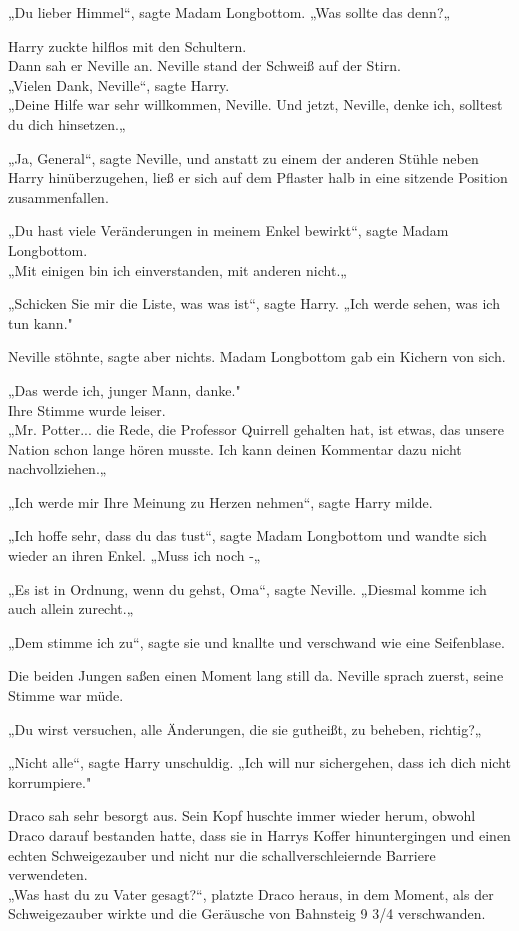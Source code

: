 {„Du lieber Himmel“, sagte Madam Longbottom. „Was sollte das denn?„

Harry zuckte hilflos mit den Schultern.\\ Dann sah er Neville an. Neville stand der Schweiß auf der Stirn.\\ „Vielen Dank, Neville“, sagte Harry.\\ „Deine Hilfe war sehr willkommen, Neville. Und jetzt, Neville, denke ich, solltest du dich hinsetzen.„

„Ja, General“, sagte Neville, und anstatt zu einem der anderen Stühle neben Harry hinüberzugehen, ließ er sich auf dem Pflaster halb in eine sitzende Position zusammenfallen.

„Du hast viele Veränderungen in meinem Enkel bewirkt“, sagte Madam Longbottom.\\ „Mit einigen bin ich einverstanden, mit anderen nicht.„

„Schicken Sie mir die Liste, was was ist“, sagte Harry. „Ich werde sehen, was ich tun kann."

Neville stöhnte, sagte aber nichts. Madam Longbottom gab ein Kichern von sich.

„Das werde ich, junger Mann, danke."\\ Ihre Stimme wurde leiser.\\ „Mr. Potter... die Rede, die Professor Quirrell gehalten hat, ist etwas, das unsere Nation schon lange hören musste. Ich kann deinen Kommentar dazu nicht nachvollziehen.„

„Ich werde mir Ihre Meinung zu Herzen nehmen“, sagte Harry milde.

„Ich hoffe sehr, dass du das tust“, sagte Madam Longbottom und wandte sich wieder an ihren Enkel. „Muss ich noch -„

„Es ist in Ordnung, wenn du gehst, Oma“, sagte Neville. „Diesmal komme ich auch allein zurecht.„

„Dem stimme ich zu“, sagte sie und knallte und verschwand wie eine Seifenblase.

Die beiden Jungen saßen einen Moment lang still da. Neville sprach zuerst, seine Stimme war müde.

„Du wirst versuchen, alle Änderungen, die sie gutheißt, zu beheben, richtig?„

„Nicht alle“, sagte Harry unschuldig. „Ich will nur sichergehen, dass ich dich nicht korrumpiere."

Draco sah sehr besorgt aus. Sein Kopf huschte immer wieder herum, obwohl Draco darauf bestanden hatte, dass sie in Harrys Koffer hinuntergingen und einen echten Schweigezauber und nicht nur die schallverschleiernde Barriere verwendeten.\\ „Was hast du zu Vater gesagt?“, platzte Draco heraus, in dem Moment, als der Schweigezauber wirkte und die Geräusche von Bahnsteig 9 3/4 verschwanden.

}
